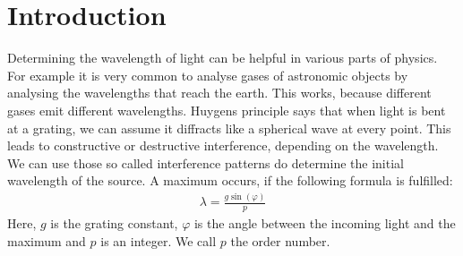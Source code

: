 \section{Introduction}

Determining the wavelength of light can be helpful in various parts of physics.
For example it is very common to analyse gases of astronomic objects by analysing the wavelengths that reach the earth.
This works, because different gases emit different wavelengths.
Huygens principle says that when light is bent at a grating, we can assume it diffracts like a spherical wave at every point.
This leads to constructive or destructive interference, depending on the wavelength.
We can use those so called interference patterns do determine the initial wavelength of the source.
A maximum occurs, if the following formula is fulfilled:
\begin{align}
	\lambda = \frac{g \sin(\varphi)}{p}
	\label{eq::wavelength}
\end{align}
Here, $g$ is the grating constant, $\varphi$ is the angle between the incoming light and the maximum and $p$ is an integer.
We call $p$ the order number.